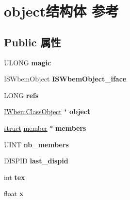 \hypertarget{structobject}{}\section{object结构体 参考}
\label{structobject}
\subsection*{Public 属性}
\begin{DoxyCompactItemize}
\item 
\mbox{\label{structobject_a68ce616007998da4bffd70841ce581bb}} 
U\+L\+O\+NG {\bfseries magic}
\item 
\mbox{\label{structobject_abe343ddb6969419a5123954050282208}} 
I\+S\+Wbem\+Object {\bfseries I\+S\+Wbem\+Object\+\_\+iface}
\item 
\mbox{\label{structobject_adcb6d36b930fa20954a6c8a3d4d7a63c}} 
L\+O\+NG {\bfseries refs}
\item 
\mbox{\label{structobject_ab62a076815a0722f8c45271e230b556a}} 
\hyperlink{interface_i_wbem_class_object}{I\+Wbem\+Class\+Object} $\ast$ {\bfseries object}
\item 
\mbox{\label{structobject_a39c31146ed5c4fe49e26f5a67cdcc1d2}} 
\hyperlink{interfacestruct}{struct} \hyperlink{structmember}{member} $\ast$ {\bfseries members}
\item 
\mbox{\label{structobject_aa98417681ad13d3ccd5db3ba8b2df087}} 
U\+I\+NT {\bfseries nb\+\_\+members}
\item 
\mbox{\label{structobject_a97bee253bd9c73b7edb3db7c95ac8bb7}} 
D\+I\+S\+P\+ID {\bfseries last\+\_\+dispid}
\item 
\mbox{\label{structobject_a0ae0fe6f3c096a539089c747bd8f7880}} 
int {\bfseries tex}
\item 
\mbox{\label{structobject_a99c3d6c60720bd444a4c0905ddd17d03}} 
float {\bfseries x}
\item 
\mbox{\label{structobject_a0d364fd717d6a576535216e0148ad5d1}} 

\end{DoxyCompactItemize}
